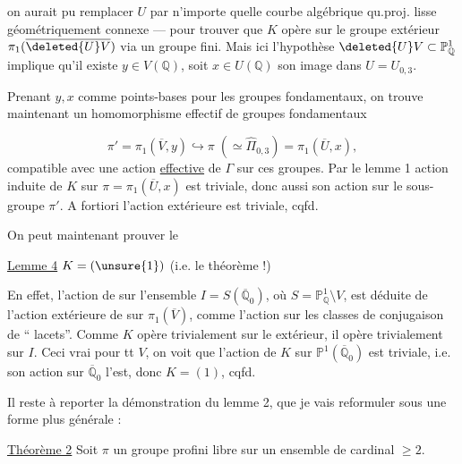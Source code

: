 \unsure{(} on aurait pu remplacer $U$ par n'importe quelle courbe algébrique qu.proj. lisse géométriquement connexe --- pour trouver que $K$ opère sur le groupe extérieur $\pi_1(\overline{\deleted{U}V})$ via un groupe fini. Mais ici l'hypothèse $\deleted{U}V\subset\mathbb P^1_{\mathbb Q}$ implique qu'il existe $y\in V(\mathbb Q)$, soit $x\in U(\mathbb Q)$ son image dans $U=U_{0,3}$.

Prenant  $y,x$ comme points-bases pour les groupes fondamentaux, on trouve maintenant un homomorphisme effectif de groupes fondamentaux


\[
\pi'=\pi_1(\overline V,y)\hookrightarrow
\pi\;(\simeq\widehat{\Pi}_{0,3})=\pi_1(\overline U,x),
\]
compatible avec une action \uline{effective} de $\Gamma$ sur ces groupes. Par le lemme 1
action induite de $K$ sur $\pi=\pi_1(\overline U,x)$ est triviale,
donc aussi son action sur le sous-groupe $\pi'$. A fortiori l'action extérieure est triviale, cqfd.

On peut maintenant prouver le

\uline{Lemme 4} $K=(\unsure{1})$ (i.e. le théorème !)

En effet,  l'action de
\deleted{\unsure{$\Gamma$}} sur l'ensemble
$I=S(\overline{\mathbb Q}_0)$, où $S=\mathbb P^1_{\mathbb Q}\setminus V$,
est déduite de l'action extérieure de
\deleted{\unsure{$\Gamma$}} sur $\pi_1(\overline V)$,
 comme l'action sur les classes de conjugaison de
`` lacets''. Comme $K$ opère trivialement sur le  extérieur,
il opère trivialement sur $I$. Ceci  vrai pour tt $V$, on voit que l'action de $K$
sur $\mathbb P^1(\overline{\mathbb Q}_0)$
est triviale, i.e. son action sur $\overline{\mathbb Q}_0$ l'est,
donc $K=(1)$, cqfd.



Il reste à reporter la démonstration du lemme 2, que je vais reformuler sous une forme plus générale :

\uline{Théorème 2} Soit $\pi$ un groupe profini libre sur un ensemble  de cardinal $\geq 2$.

